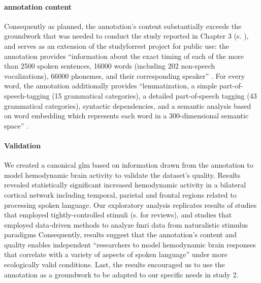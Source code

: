 \paragraph{annotation content}
%
Consequently as planned, the annotation's content substantially exceeds the
groundwork that was needed to conduct the study reported in Chapter 3 (s.
\citep{haeusler2022processing}), and serves as an extension of the studyforrest
project for public use:
the annotation provides ``information about the exact timing of each of the more than 2500
spoken sentences, 16000 words (including 202 non-speech vocalizations), 66000
phonemes, and their corresponding speaker'' \citep{haeusler2021speechanno}.
%
For every word, the annotation additionally provides ``lemmatization, a simple
part-of-speech-tagging (15 grammatical categories), a detailed part-of-speech
tagging (43 grammatical categories), syntactic dependencies, and a semantic
analysis based on word embedding which represents each word in a 300-dimensional
semantic space'' \citep{haeusler2021speechanno}.


\paragraph{Validation}


We created a canonical \ac{glm} based on information drawn from the annotation
to model hemodynamic brain activity to validate the dataset's quality.
Results revealed statistically significant increased hemodynamic activity in a
bilateral cortical network including temporal, parietal and frontal regions
related to processing spoken language.
Our exploratory analysis replicates results of studies that employed
tightly-controlled stimuli (s. \citep{friederici2011brain,
hickok2007cortical,price2012twentyyears} for reviews), and studies that employed
data-driven methods to analyze \ac{fmri} data from naturalistic stimulus
paradigms \citep{honey2012not, lerner2011topographic, silbert2014coupled}
Consequently, results suggest that the annotation's content and quality enables
independent ``researchers to model hemodynamic brain responses that correlate
with a variety of aspects of spoken language'' \citep{haeusler2021speechanno}
under more ecologically valid conditions.
Last, the results encouraged us to use the annotation as a groundwork to be
adapted to our specific needs in study 2.


